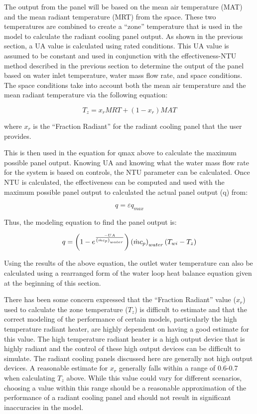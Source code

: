 {The output from the panel will be based on the mean air temperature (MAT) and the mean radiant temperature (MRT) from the space.  These two temperatures are combined to create a “zone” temperature that is used in the model to calculate the radiant cooling panel output.  As shown in the previous section, a UA value is calculated using rated conditions.  This UA value is assumed to be constant and used in conjunction with the effectiveness-NTU method described in the previous section to determine the output of the panel based on water inlet temperature, water mass flow rate, and space conditions.  The space conditions take into account both the mean air temperature and the mean radiant temperature via the following equation:

\begin{equation}
T_z = x_r MRT+ ( 1-x_r ) MAT
\end{equation}

where \(x_r\) is the “Fraction Radiant” for the radiant cooling panel that the user provides.

This is then used in the equation for qmax above to calculate the maximum possible panel output.  Knowing UA and knowing what the water mass flow rate for the system is based on controls, the NTU parameter can be calculated.  Once NTU is calculated, the effectiveness can be computed and used with the maximum possible panel output to calculated the actual panel output (q) from:

\begin{equation}
q = \varepsilon {q_{max}}
\end{equation}

Thus, the modeling equation to find the panel output is:

\begin{equation}
q = \PB{1-e^{\frac{-UA}{\PB{\dot{m} c_p}_{water}}}} \PB{\dot{m} c_p}_{water} \PB{{T}_{wi}-{T}_{z}}
\end{equation}

Using the results of the above equation, the outlet water temperature can also be calculated using a rearranged form of the water loop heat balance equation given at the beginning of this section.

There has been some concern expressed that the “Fraction Radiant” value (\(x_r\)) used to calculate the zone temperature (\(T_z\)) is difficult to estimate and that the correct modeling of the performance of certain models, particularly the high temperature radiant heater, are highly dependent on having a good estimate for this value.  The high temperature radiant heater is a high output device that is highly radiant and the control of these high output devices can be difficult to simulate.  The radiant cooling panels discussed here are generally not high output devices.  A reasonable estimate for \(x_r\) generally falls within a range of 0.6-0.7 when calculating \(T_z\) above.  While this value could vary for different scenarios, choosing a value within this range should be a reasonable approximation of the performance of a radiant cooling panel and should not result in significant inaccuracies in the model.

}

